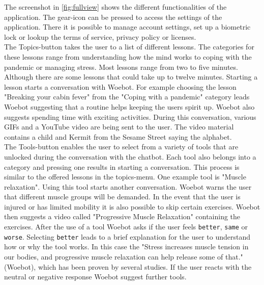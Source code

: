 The screenshot in \autoref{fig:fullview} shows the different functionalities of the application.
The gear-icon can be pressed to access the settings of the application.
There it is possible to manage account settings, set up a biometric lock or lookup the terms of service, privacy policy or licenses.\\

The Topics-button takes the user to a list of different lessons.
The categories for these lessons range from understanding how the mind works to coping with the pandemic or managing stress.
Most lessons range from two to five minutes.
Although there are some lessons that could take up to twelve minutes.
Starting a lesson starts a conversation with Woebot.
For example choosing the lesson "Breaking your cabin fever" from the "Coping with a pandemic" category leads Woebot suggesting that a routine helps keeping the users spirit up.
Woebot also suggests spending time with exciting activities.
During this conversation, various GIFs and a YouTube video are being sent to the user.
The video material contains a child and Kermit from the Sesame Street saying the alphabet. \\

The Tools-button enables the user to select from a variety of tools that are unlocked during the conversation with the chatbot.
Each tool also belongs into a category and pressing one results in starting a conversation.
This process is similar to the offered lessons in the topics-menu. One example tool is "Muscle relaxation".
Using this tool starts another conversation. Woebot warns the user that different muscle groups will be demanded.
In the event that the user is injured or has limited mobility it is also possible to skip certain exercises.
Woebot then suggests a video called "Progressive Muscle Relaxation" containing the exercises.
After the use of a tool Woebot asks if the user feels \texttt{better}, \texttt{same} or \texttt{worse}.
Selecting \texttt{better} leads to a brief explanation for the user to understand how or why the tool works.
In this case the "Stress increases muscle tension in our bodies, and progressive muscle relaxation can help release some of that." (Woebot), which has been proven by several studies\cite{progressive-muscle, stress-pmr}.
If the user reacts with the neutral or negative response Woebot suggest further tools.\\

